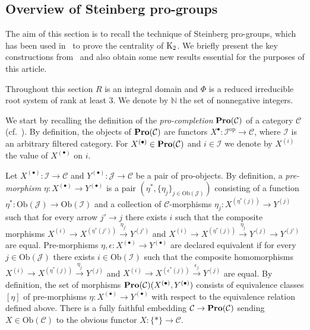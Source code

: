 \documentclass[oneside, 11pt]{amsart} \pdfoutput=1
\begin{document}
\subsection{Overview of Steinberg pro-groups}
The aim of this section is to recall the technique of Steinberg pro-groups, which has been used in~\cite{LSV20} to prove the centrality of ${\mathrm{K}}_2$.
We briefly present the key constructions from~\cite{LSV20} and also obtain some new results essential for the purposes of this article. 

Throughout this section $R$ is an integral domain and $\Phi$ is a reduced irreducible root system of rank at least $3$.
We denote by $\mathbb{N}$ the set of nonnegative integers.

We start by recalling the definition of the {\it pro-completion} ${\normalfont\textbf{Pro}}(\mathcal{C})$ of a category $\mathcal{C}$ (cf.~\cite[\S~2.1]{LSV20}).
By definition, the objects of ${\normalfont\textbf{Pro}}(\mathcal{C})$ are functors $X^{\bullet}\colon\mathcal{I}^{\mathrm{op}} \to \mathcal{C}$, where $\mathcal{I}$ is an arbitrary filtered category. For $X^{(\bullet)} \in 
{\normalfont\textbf{Pro}}(\mathcal{C})$ and $i \in \mathcal{I}$ we denote by $X^{(i)}$ the value of $X^{(\bullet)}$ on $i$. 

Let $X^{(\bullet)}\colon\mathcal{I}\to\mathcal{C}$ and $Y^{(\bullet)}\colon\mathcal{J}\to\mathcal{C}$ be a pair of pro-objects.
By definition, a {\it pre-morphism} $\eta\colon X^{(\bullet)} \to Y^{(\bullet)}$ is a pair $(\eta^*, \{\eta_j\}_{j\in\mathrm{Ob}(\mathcal{J})})$ consisting of a function $\eta^*\colon \mathrm{Ob}(\mathcal{J})\to\mathrm{Ob}(\mathcal{I})$ and a collection of $\mathcal{C}$-morphisms $\eta_j\colon X^{(\eta^*(j))}\to Y^{(j)}$ such that for every arrow $j' \to j$ there exists $i$ such that the composite morphisms $X^{(i)} \to X^{(\eta^*(j'))} \xrightarrow{\eta_{j'}} Y^{(j')}$ and $X^{(i)} \to X^{(\eta^*(j))} \xrightarrow{\eta_j} Y^{(j)} \to Y^{(j')}$ are equal. 
Pre-morphisms $\eta, \epsilon \colon X^{(\bullet)} \to Y^{(\bullet)}$ are declared equivalent if for every $j \in \mathrm{Ob}(\mathcal{J})$ there exists $i \in \mathrm{Ob}(\mathcal{I})$ such that the composite homomorphisms $X^{(i)} \to X^{(\eta^*(j))} \xrightarrow{\eta_j} Y^{(j)}$ and $X^{(i)} \to X^{(\epsilon^*(j))} \xrightarrow{\epsilon_j} Y^{(j)}$ are equal. By definition, the set of morphisms ${\normalfont\textbf{Pro}}(\mathcal{C})(X^{(\bullet)}, Y^{(\bullet)})$ consists of equivalence classes $[\eta]$ of pre-morphisms $\eta \colon X^{(\bullet)} \to Y^{(\bullet)}$ with respect to the equivalence relation defined above. There is a fully faithful embedding $\mathcal{C}\to{\normalfont\textbf{Pro}}(\mathcal{C})$ sending $X \in \mathrm{Ob}(\mathcal{C})$ to the obvious functor $X\colon \{ * \} \to \mathcal{C}$. 
\end{document}
